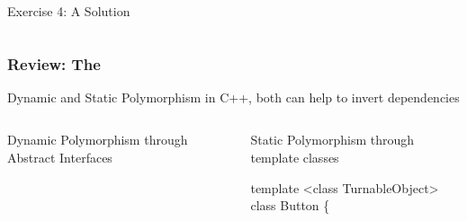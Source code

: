 \documentclass[9pt]{beamer}
\begin{document}
\begin{frame}
\begin{exampleblock}{Exercise 4: A Solution}
\begin{columns}[t]
  \end{columns}
  
\end{exampleblock}
\end{frame}

\begin{frame}[fragile]
  \frametitle{Review: The \secname}
\vfill
\begin{block}{Dynamic and Static Polymorphism}
\small
in C++, both can help to invert dependencies\\
\begin{columns}[t]

    \begin{column}{.45\textwidth}
       \begin{block}{Dynamic Polymorphism through Abstract Interfaces}

          \begin{center}
          \end{center}
       \end{block}
    \end{column}
\pause
    \begin{column}{.45\textwidth}
       \begin{block}{Static Polymorphism through template classes}

          \begin{center}
            \scriptsize
              \begin{semiverbatim}
template <class TurnableObject>
class Button \{


\end{semiverbatim}
\end{center}
\end{block}
\end{column}
\end{columns}
\end{block}
\end{frame}
\end{document}
